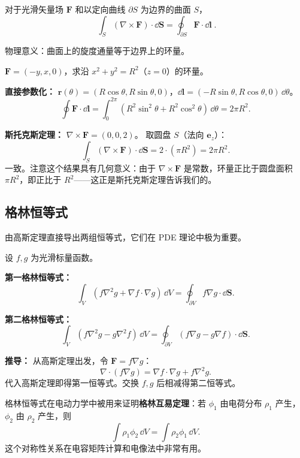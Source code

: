 \begin{theorem}[斯托克斯定理]
对于光滑矢量场 $\mathbf{F}$ 和以定向曲线 $\partial S$ 为边界的曲面 $S$，
\[
\boxed{\;\int_S (\nabla\times\mathbf{F})\cdot\dd\mathbf{S} = \oint_{\partial S} \mathbf{F}\cdot\dd\mathbf{l}\;}.
\label{eq:stokes}
\]

物理意义：曲面上的旋度通量等于边界上的环量。
\end{theorem}

\begin{example}
$\mathbf{F} = (-y, x, 0)$，求沿 $x^2+y^2=R^2$（$z=0$）的环量。

\textbf{直接参数化：}
$\mathbf{r}(\theta) = (R\cos\theta, R\sin\theta, 0)$，$\dd\mathbf{l}=(-R\sin\theta, R\cos\theta, 0)\,\dd\theta$。
\[
\oint\mathbf{F}\cdot\dd\mathbf{l} = \int_0^{2\pi} (R^2\sin^2\theta+R^2\cos^2\theta)\,\dd\theta = 2\pi R^2.
\]

\textbf{斯托克斯定理：}
$\nabla\times\mathbf{F} = (0,0,2)$。
取圆盘 $S$（法向 $\mathbf{e}_z$）：
\[
\int_S (\nabla\times\mathbf{F})\cdot\dd\mathbf{S} = 2\cdot(\pi R^2) = 2\pi R^2.
\]
一致。注意这个结果具有几何意义：由于 $\nabla\times\mathbf{F}$ 是常数，环量正比于圆盘面积 $\pi R^2$，即正比于 $R^2$——这正是斯托克斯定理告诉我们的。
\end{example}

\subsection{格林恒等式}

由高斯定理直接导出两组恒等式，它们在 PDE 理论中极为重要。

设 $f,g$ 为光滑标量函数。

\textbf{第一格林恒等式：}
\[
\int_V (f\nabla^2 g + \nabla f\cdot\nabla g)\,\dd V = \oint_{\partial V} f\nabla g\cdot\dd\mathbf{S}.
\label{eq:green1}
\]

\textbf{第二格林恒等式：}
\[
\int_V (f\nabla^2 g - g\nabla^2 f)\,\dd V = \oint_{\partial V} (f\nabla g - g\nabla f)\cdot\dd\mathbf{S}.
\label{eq:green2}
\]

\textbf{推导：} 从高斯定理出发，令 $\mathbf{F} = f\nabla g$：
\[
\nabla\cdot(f\nabla g) = \nabla f\cdot\nabla g + f\nabla^2 g.
\]
代入高斯定理即得第一恒等式。交换 $f,g$ 后相减得第二恒等式。

\begin{insight}[格林恒等式的物理意义]
格林恒等式在电动力学中被用来证明\textbf{格林互易定理}：若 $\phi_1$ 由电荷分布 $\rho_1$ 产生，$\phi_2$ 由 $\rho_2$ 产生，则
\[
\int\rho_1\phi_2\,\dd V = \int\rho_2\phi_1\,\dd V.
\]
这个对称性关系在电容矩阵计算和电像法中非常有用。
\end{insight}

